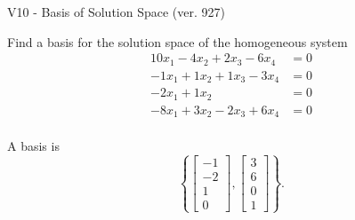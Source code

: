 \begin{exercise}
  \begin{exerciseTitle}V10 - Basis of Solution Space (ver. 927)\end{exerciseTitle}
  \begin{exerciseStatement}
    Find a basis for the solution space of the homogeneous system 
\begin{align*}
 10 x_ 1 -4 x_ 2 + 2 x_ 3 -6 x_ 4 &= 0  \\ 
  -1 x_ 1 + 1 x_ 2 + 1 x_ 3 -3 x_ 4 &= 0  \\ 
  -2 x_ 1 + 1 x_ 2 &= 0  \\ 
  -8 x_ 1 + 3 x_ 2 -2 x_ 3 + 6 x_ 4 &= 0  \\ 
 \end{align*}


 
  \end{exerciseStatement}

  \begin{exerciseAnswer}
   A basis is   
\[\left\{\left[\begin{array}{c}
-1 \\
-2 \\
1 \\
0
\end{array}\right] , \left[\begin{array}{c}
3 \\
6 \\
0 \\
1
\end{array}\right]\right\}.\]

  


  \end{exerciseAnswer}
\end{exercise}